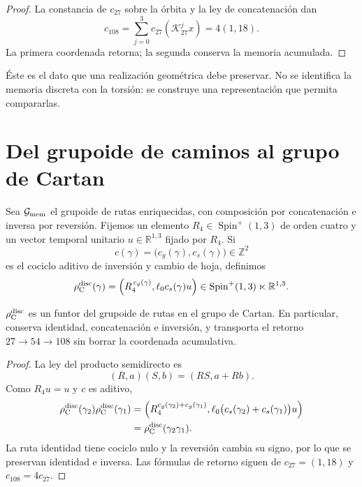 \begin{proof}
La constancia de \(c_{27}\) sobre la órbita y la ley de concatenación dan
\[
 c_{108}=\sum_{j=0}^{3}c_{27}(\mathcal K_{27}^jx)
 =4(1,18).
\]
La primera coordenada retorna; la segunda conserva la memoria acumulada.
\end{proof}

Éste es el dato que una realización geométrica debe preservar.  No se
identifica la memoria discreta con la torsión: se construye una representación
que permita compararlas.

\section{Del grupoide de caminos al grupo de Cartan}

Sea \(\mathcal G_{\rm mem}\) el grupoide de rutas enriquecidas, con
composición por concatenación e inversa por reversión. Fijemos un elemento
\(R_4\in\operatorname{Spin}^+(1,3)\) de orden cuatro y un vector temporal
unitario \(u\in\mathbb R^{1,3}\) fijado por \(R_4\). Si
\[
c(\gamma)=\bigl(c_g(\gamma),c_s(\gamma)\bigr)\in\mathbb Z^2
\]
es el cociclo aditivo de inversión y cambio de hoja, definimos
\[
\rho_{\rm C}^{\rm disc}(\gamma)
=
\left(
R_4^{\,c_g(\gamma)},
\ell_0c_s(\gamma)u
\right)
\in\operatorname{Spin}^+(1,3)\ltimes\mathbb R^{1,3}.
\]

\begin{theorem}
\label{thm:realizacion-discreta-cartan-rev6}
\(\rho_{\rm C}^{\rm disc}\) es un funtor del grupoide de rutas en el grupo de
Cartan. En particular, conserva identidad, concatenación e inversión, y
transporta el retorno \(27\to54\to108\) sin borrar la coordenada acumulativa.
\end{theorem}

\begin{proof}
La ley del producto semidirecto es
\[
(R,a)(S,b)=(RS,a+Rb).
\]
Como \(R_4u=u\) y \(c\) es aditivo,
\[
\begin{aligned}
\rho_{\rm C}^{\rm disc}(\gamma_2)
\rho_{\rm C}^{\rm disc}(\gamma_1)
&=
\left(
R_4^{c_g(\gamma_2)+c_g(\gamma_1)},
\ell_0\bigl(c_s(\gamma_2)+c_s(\gamma_1)\bigr)u
\right)\\
&=\rho_{\rm C}^{\rm disc}(\gamma_2\gamma_1).
\end{aligned}
\]
La ruta identidad tiene cociclo nulo y la reversión cambia su signo, por lo
que se preservan identidad e inversa. Las fórmulas de retorno siguen de
\(c_{27}=(1,18)\) y \(c_{108}=4c_{27}\).
\end{proof}


